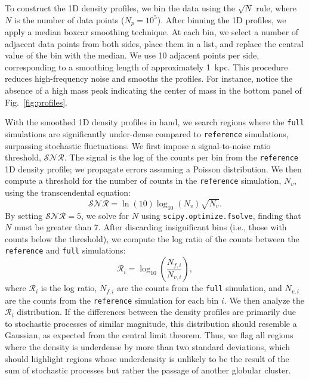 \documentclass{aa}
\begin{document}
\begin{appendix}
    To construct the 1D density profiles, we bin the data using the $\sqrt{N}$ rule, where $N$ is the number of data points ($N_p = 10^5$). After binning the 1D profiles, we apply a median boxcar smoothing technique. At each bin, we select a number of adjacent data points from both sides, place them in a list, and replace the central value of the bin with the median. We use 10 adjacent points per side, corresponding to a smoothing length of approximately 1~kpc. This procedure reduces high-frequency noise and smooths the profiles. For instance, notice the absence of a high mass peak indicating the center of mass in the bottom panel of Fig.~\ref{fig:profiles}.

    With the smoothed 1D density profiles in hand, we search regions where the \texttt{full} simulations are significantly under-dense compared to \texttt{reference} simulations, surpassing stochastic fluctuations. We first impose a signal-to-noise ratio threshold, $\mathcal{SNR}$. The signal is the log of the counts per bin from the \texttt{reference} 1D density profile; we propagate errors assuming a Poisson distribution. We then compute a threshold for the number of counts in the \texttt{reference} simulation, $N_v$, using the transcendental equation:
    \begin{equation}
        \mathcal{SNR} = \ln(10) \log_{10}\left(N_v\right) \sqrt{N_v}.
      \end{equation} \label{eq:density_threshold}
    By setting $\mathcal{SNR} = 5$, we solve for $N$ using \texttt{scipy.optimize.fsolve}, finding that $N$ must be greater than 7. After discarding insignificant bins (i.e., those with counts below the threshold), we compute the log ratio of the counts between the \texttt{reference} and \texttt{full} simulations:
    \begin{equation}
        \mathcal{R}_i = \log_{10}\left(\frac{N_{f,i}}{N_{v,i}}\right),
      \end{equation}
    where $\mathcal{R}_i$ is the log ratio, $N_{f,i}$ are the counts from the \texttt{full} simulation, and $N_{v,i}$ are the counts from the \texttt{reference} simulation for each bin $i$. We then analyze the $\mathcal{R}_i$ distribution. If the differences between the density profiles are primarily due to stochastic processes of similar magnitude, this distribution should resemble a Gaussian, as expected from the central limit theorem. Thus, we flag all regions where the density is underdense by more than two standard deviations, which should highlight regions whose underdensity is unlikely to be the result of the sum of stochastic processes but rather the passage of another globular cluster. 


\end{appendix}
\end{document}
